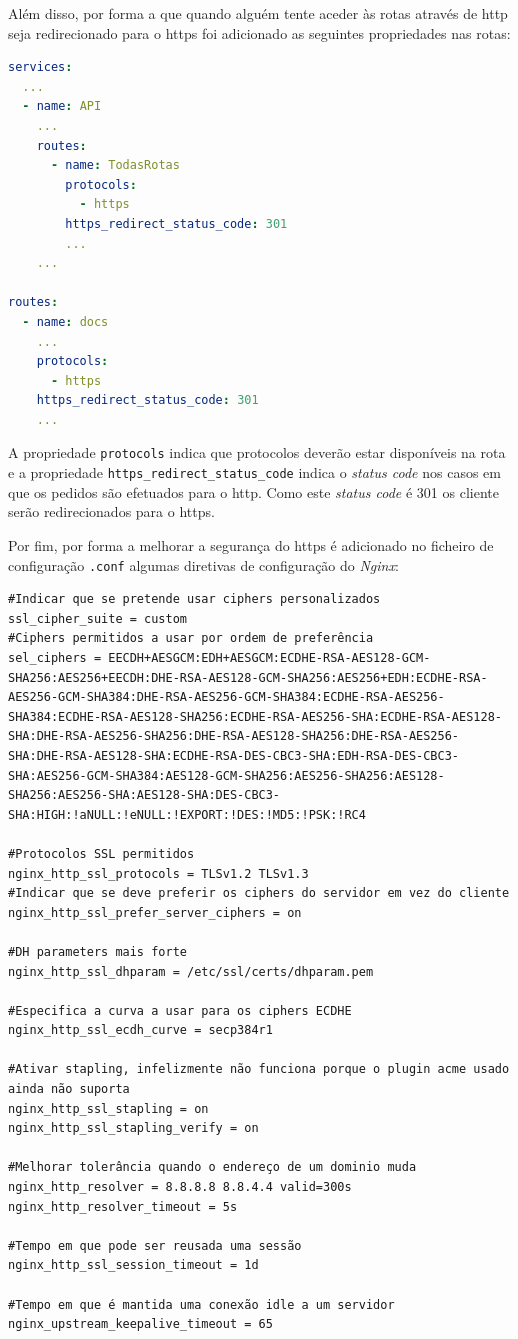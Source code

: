 Além disso, por forma a que quando alguém tente aceder às rotas através de \acrshort{http} seja redirecionado para o \acrshort{https} foi adicionado as seguintes propriedades nas rotas:
\begin{lstlisting}[language=yaml, caption=Configuração declarativa do \textit{Kong}: Serviço para a geração de certificados \acrshort{tls}]
services:
  ...
  - name: API
    ...
    routes:
      - name: TodasRotas
        protocols:
          - https
        https_redirect_status_code: 301
        ...
    ...

routes:
  - name: docs
    ...
    protocols:
      - https
    https_redirect_status_code: 301
    ...
\end{lstlisting}
A propriedade \texttt{protocols} indica que protocolos deverão estar disponíveis na rota e a propriedade \texttt{https\_redirect\_status\_code} indica o \textit{status code} nos casos em que os pedidos são efetuados para o \acrshort{http}. Como este \textit{status code} é 301 os cliente serão redirecionados para o \acrshort{https}.

Por fim, por forma a melhorar a segurança do \acrshort{https} é adicionado no ficheiro de configuração \texttt{.conf} algumas diretivas de configuração do \textit{Nginx}:
\begin{lstlisting}[caption=Configurações do \textit{Nginx} no ficheiro de configuração \texttt{.conf}]
#Indicar que se pretende usar ciphers personalizados
ssl_cipher_suite = custom
#Ciphers permitidos a usar por ordem de preferência
sel_ciphers = EECDH+AESGCM:EDH+AESGCM:ECDHE-RSA-AES128-GCM-SHA256:AES256+EECDH:DHE-RSA-AES128-GCM-SHA256:AES256+EDH:ECDHE-RSA-AES256-GCM-SHA384:DHE-RSA-AES256-GCM-SHA384:ECDHE-RSA-AES256-SHA384:ECDHE-RSA-AES128-SHA256:ECDHE-RSA-AES256-SHA:ECDHE-RSA-AES128-SHA:DHE-RSA-AES256-SHA256:DHE-RSA-AES128-SHA256:DHE-RSA-AES256-SHA:DHE-RSA-AES128-SHA:ECDHE-RSA-DES-CBC3-SHA:EDH-RSA-DES-CBC3-SHA:AES256-GCM-SHA384:AES128-GCM-SHA256:AES256-SHA256:AES128-SHA256:AES256-SHA:AES128-SHA:DES-CBC3-SHA:HIGH:!aNULL:!eNULL:!EXPORT:!DES:!MD5:!PSK:!RC4

#Protocolos SSL permitidos
nginx_http_ssl_protocols = TLSv1.2 TLSv1.3
#Indicar que se deve preferir os ciphers do servidor em vez do cliente
nginx_http_ssl_prefer_server_ciphers = on

#DH parameters mais forte
nginx_http_ssl_dhparam = /etc/ssl/certs/dhparam.pem

#Especifica a curva a usar para os ciphers ECDHE
nginx_http_ssl_ecdh_curve = secp384r1

#Ativar stapling, infelizmente não funciona porque o plugin acme usado ainda não suporta
nginx_http_ssl_stapling = on
nginx_http_ssl_stapling_verify = on

#Melhorar tolerância quando o endereço de um dominio muda
nginx_http_resolver = 8.8.8.8 8.8.4.4 valid=300s
nginx_http_resolver_timeout = 5s

#Tempo em que pode ser reusada uma sessão
nginx_http_ssl_session_timeout = 1d

#Tempo em que é mantida uma conexão idle a um servidor
nginx_upstream_keepalive_timeout = 65
\end{lstlisting}

